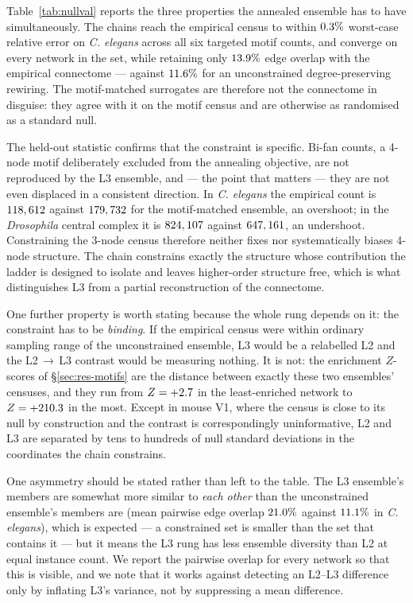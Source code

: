 

Table~\ref{tab:nullval} reports the three properties the annealed ensemble has to have
simultaneously. The chains reach the empirical census to within
$0.3\%$ worst-case relative error on \textit{C. elegans} across all six
targeted motif counts, and converge on every network in the set, while retaining only
$13.9\%$ edge overlap with the empirical connectome --- against
$11.6\%$ for an unconstrained degree-preserving rewiring. The motif-matched surrogates are therefore not the
connectome in disguise: they agree with it on the motif census and are otherwise as
randomised as a standard null.

The held-out statistic confirms that the constraint is specific. Bi-fan counts, a
4-node motif deliberately excluded from the annealing objective, are not reproduced by
the L3 ensemble, and --- the point that matters --- they are not even displaced in a
consistent direction. In \textit{C. elegans} the empirical count is $118,612$
against $179,732$ for the motif-matched ensemble, an overshoot; in the
\textit{Drosophila} central complex it is $824,107$ against
$647,161$, an undershoot. Constraining the 3-node census therefore neither
fixes nor systematically biases 4-node structure. The chain constrains exactly the
structure whose contribution the ladder is designed to isolate and leaves higher-order
structure free, which is what distinguishes L3 from a partial reconstruction of the
connectome.

One further property is worth stating because the whole rung depends on it: the
constraint has to be \emph{binding}. If the empirical census were within ordinary
sampling range of the unconstrained ensemble, L3 would be a relabelled L2 and the
L2\,$\rightarrow$\,L3 contrast would be measuring nothing. It is not: the enrichment
$Z$-scores of \S\ref{sec:res-motifs} are the distance between exactly these two
ensembles' censuses, and they run from $Z = +2.7$ in the least-enriched network to
$Z = +210.3$ in the most. Except in mouse V1, where the census is close to its null
by construction and the contrast is correspondingly uninformative, L2 and L3 are
separated by tens to hundreds of null standard deviations in the coordinates the chain
constrains.

One asymmetry should be stated rather than left to the table. The L3 ensemble's members
are somewhat more similar to \emph{each other} than the unconstrained ensemble's members
are (mean pairwise edge overlap $21.0\%$ against
$11.1\%$ in \textit{C. elegans}), which is expected --- a constrained set is
smaller than the set that contains it --- but it means the L3 rung has less ensemble
diversity than L2 at equal instance count. We report the pairwise overlap for every
network so that this is visible, and we note that it works against detecting an L2--L3
difference only by inflating L3's variance, not by suppressing a mean difference.


